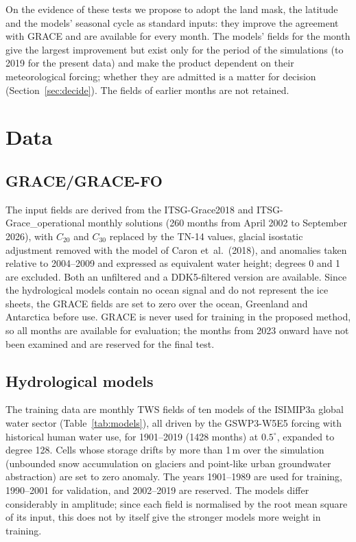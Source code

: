 \documentclass[11pt,a4paper]{article}
\begin{document}
On the evidence of these tests we propose to adopt the land mask, the latitude and the models'
seasonal cycle as standard inputs: they improve the agreement with GRACE and are available for
every month. The models' fields for the month give the largest improvement but exist only for
the period of the simulations (to 2019 for the present data) and make the product dependent on
their meteorological forcing; whether they are admitted is a matter for decision
(Section~\ref{sec:decide}). The fields of earlier months are not retained.

\section{Data}

\subsection{GRACE/GRACE-FO}
The input fields are derived from the ITSG-Grace2018 and ITSG-Grace\_operational monthly
solutions (260 months from April 2002 to September 2026), with $C_{20}$ and $C_{30}$ replaced
by the TN-14 values, glacial isostatic adjustment removed with the model of Caron et~al.\
(2018), and anomalies taken relative to 2004--2009 and expressed as equivalent water height;
degrees 0 and 1 are excluded. Both an unfiltered and a DDK5-filtered version are available.
Since the hydrological models contain no ocean signal and do not represent the ice sheets, the
GRACE fields are set to zero over the ocean, Greenland and Antarctica before use. GRACE is
never used for training in the proposed method, so all months are available for evaluation;
the months from 2023 onward have not been examined and are reserved for the final test.

\subsection{Hydrological models}
The training data are monthly TWS fields of ten models of the ISIMIP3a global water sector
(Table~\ref{tab:models}), all driven by the GSWP3-W5E5 forcing with historical human water
use, for 1901--2019 (1428 months) at $0.5^\circ$, expanded to degree 128. Cells whose storage
drifts by more than 1\,m over the simulation (unbounded snow accumulation on glaciers and
point-like urban groundwater abstraction) are set to zero anomaly. The years 1901--1989 are
used for training, 1990--2001 for validation, and 2002--2019 are reserved. The models differ
considerably in amplitude; since each field is normalised by the root mean square of its input,
this does not by itself give the stronger models more weight in training.
\end{document}
